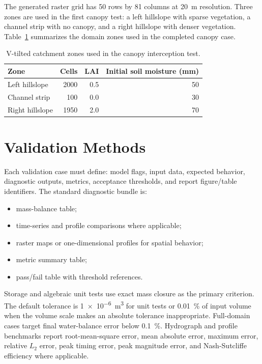 \documentclass[11pt]{article}
\begin{document}
The generated raster grid has 50 rows by 81 columns at \SI{20}{\meter} resolution. Three zones are used in the first canopy test: a left hillslope with sparse vegetation, a channel strip with no canopy, and a right hillslope with denser vegetation. Table~\ref{tab:vtilted-domain} summarizes the domain zones used in the completed canopy case.

\begin{table}[htbp]
\centering
\caption{V-tilted catchment zones used in the canopy interception test.}
\label{tab:vtilted-domain}
\begin{tabular}{lrrr}
\toprule
Zone & Cells & LAI & Initial soil moisture (mm) \\
\midrule
Left hillslope & 2000 & 0.5 & 50 \\
Channel strip & 100 & 0.0 & 30 \\
Right hillslope & 1950 & 2.0 & 70 \\
\bottomrule
\end{tabular}
\end{table}

\section{Validation Methods}
\label{sec:methods}
Each validation case must define: model flags, input data, expected behavior, diagnostic outputs, metrics, acceptance thresholds, and report figure/table identifiers. The standard diagnostic bundle is:
\begin{itemize}
  \item mass-balance table;
  \item time-series and profile comparisons where applicable;
  \item raster maps or one-dimensional profiles for spatial behavior;
  \item metric summary table;
  \item pass/fail table with threshold references.
\end{itemize}

Storage and algebraic unit tests use exact mass closure as the primary criterion. The default tolerance is \SI{1e-6}{\cubic\meter} for unit tests or \SI{0.01}{\percent} of input volume when the volume scale makes an absolute tolerance inappropriate. Full-domain cases target final water-balance error below \SI{0.1}{\percent}. Hydrograph and profile benchmarks report root-mean-square error, mean absolute error, maximum error, relative $L_2$ error, peak timing error, peak magnitude error, and Nash-Sutcliffe efficiency where applicable.
\end{document}
